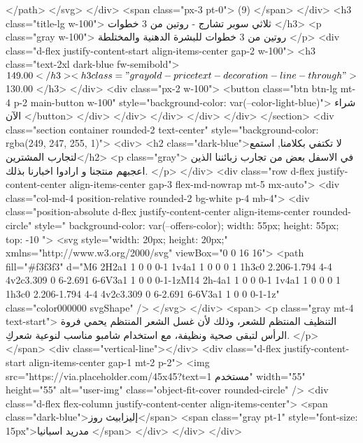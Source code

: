                     </path>
                  </svg>
                </div>
                <span class="px-3 pt-0"> (9) </span>
              </div>
              <h3 class="title-lg w-100">
                ثلاثي سوبر تشارج - روتين من 3 خطوات
              </h3>
              <p class="gray w-100">
                روتين من 3 خطوات للبشرة الدهنية والمختلطة
              </p>
              <div class="d-flex justify-content-start align-items-center gap-2 w-100">
                <h3 class="text-2xl dark-blue fw-semibold">$149.00</h3>
                <h3 class="gray old-price text-decoration-line-through">
                  $130.00
                </h3>
              </div>
              <div class="px-2 w-100">
                <button class="btn btn-lg mt-4 p-2 main-button w-100"
                  style="background-color: var(--color-light-blue)">
                  شراء الآن
                </button>
              </div>
            </div>
          </div>
        </div>
      </div>
    </section>
    <div class="section container rounded-2 text-center" style="background-color: rgba(249, 247, 255, 1)">
      <div>
        <h2 class="dark-blue">لا تكتفي بكلامنا, استمع لتجارب المشترين</h2>
        <p class="gray">
          في الاسفل بعض من تجارب زبائننا الذين اعجبهم منتجنا و ارادوا اخبارنا
          بذلك.
        </p>
      </div>
      <div class="row d-flex justify-content-center align-items-center gap-3 flex-md-nowrap mt-5 mx-auto">
        <div class="col-md-4 position-relative rounded-2 bg-white p-4 mb-4">
          <div class="position-absolute d-flex justify-content-center align-items-center rounded-circle" style="
              background-color: var(--offers-color);
              width: 55px;
              height: 55px;
              top: -10%
            ">
            <svg style="width: 20px; height: 20px;" xmlns="http://www.w3.org/2000/svg" viewBox="0 0 16 16">
              <path fill="#f3f3f3"
                d="M6 2H2a1 1 0 0 0-1 1v4a1 1 0 0 0 1 1h3c0 2.206-1.794 4-4 4v2c3.309 0 6-2.691 6-6V3a1 1 0 0 0-1-1zM14 2h-4a1 1 0 0 0-1 1v4a1 1 0 0 0 1 1h3c0 2.206-1.794 4-4 4v2c3.309 0 6-2.691 6-6V3a1 1 0 0 0-1-1z"
                class="color000000 svgShape" />
            </svg>
          </div>
          <span>
            <p class="gray mt-4 text-start">
              التنظيف المنتظم للشعر، وذلك لأن غسل الشعر المنتظم يحمي فروة الرأس
              لتبقى صحية ونظيفة، مع استخدام شامبو مناسب لنوعية شعركِ.
            </p>
          </span>
          <div class="vertical-line"></div>
          <div class="d-flex justify-content-start align-items-center gap-1 mt-2 p-2">
            <img src="https://via.placeholder.com/45x45?text=مستخدم 1" width="55" height="55" alt="user-img"
              class="object-fit-cover rounded-circle" />
            <div class="d-flex flex-column justify-content-center align-items-center">
              <span class="dark-blue">إليزابيث روز</span>
              <span class="gray pt-1" style="font-size: 15px">مدريد اسبانيا
              </span>
            </div>
          </div>
        </div>

